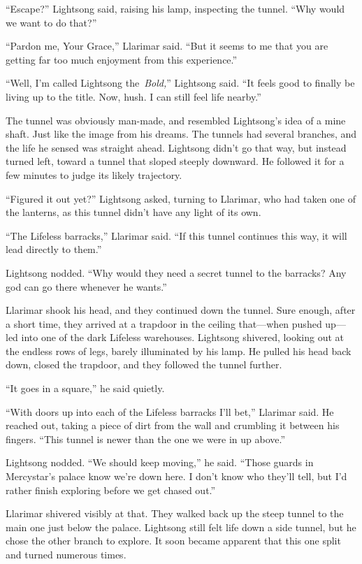 “Escape?” Lightsong said, raising his lamp, inspecting the tunnel. “Why would we want to do that?”

“Pardon me, Your Grace,” Llarimar said. “But it seems to me that you are getting far too much enjoyment from this experience.”

“Well, I’m called Lightsong the~\textit{Bold,}” Lightsong said. “It feels good to finally be living up to the title. Now, hush. I can still feel life nearby.”

The tunnel was obviously man-made, and resembled Lightsong’s idea of a mine shaft. Just like the image from his dreams. The tunnels had several branches, and the life he sensed was straight ahead. Lightsong didn’t go that way, but instead turned left, toward a tunnel that sloped steeply downward. He followed it for a few minutes to judge its likely trajectory.

“Figured it out yet?” Lightsong asked, turning to Llarimar, who had taken one of the lanterns, as this tunnel didn’t have any light of its own.

“The Lifeless barracks,” Llarimar said. “If this tunnel continues this way, it will lead directly to them.”

Lightsong nodded. “Why would they need a secret tunnel to the barracks? Any god can go there whenever he wants.”

Llarimar shook his head, and they continued down the tunnel. Sure enough, after a short time, they arrived at a trapdoor in the ceiling that—when pushed up—led into one of the dark Lifeless warehouses. Lightsong shivered, looking out at the endless rows of legs, barely illuminated by his lamp. He pulled his head back down, closed the trapdoor, and they followed the tunnel further.

“It goes in a square,” he said quietly.

“With doors up into each of the Lifeless barracks I’ll bet,” Llarimar said. He reached out, taking a piece of dirt from the wall and crumbling it between his fingers. “This tunnel is newer than the one we were in up above.”

Lightsong nodded. “We should keep moving,” he said. “Those guards in Mercystar’s palace know we’re down here. I don’t know who they’ll tell, but I’d rather finish exploring before we get chased out.”

Llarimar shivered visibly at that. They walked back up the steep tunnel to the main one just below the palace. Lightsong still felt life down a side tunnel, but he chose the other branch to explore. It soon became apparent that this one split and turned numerous times.

